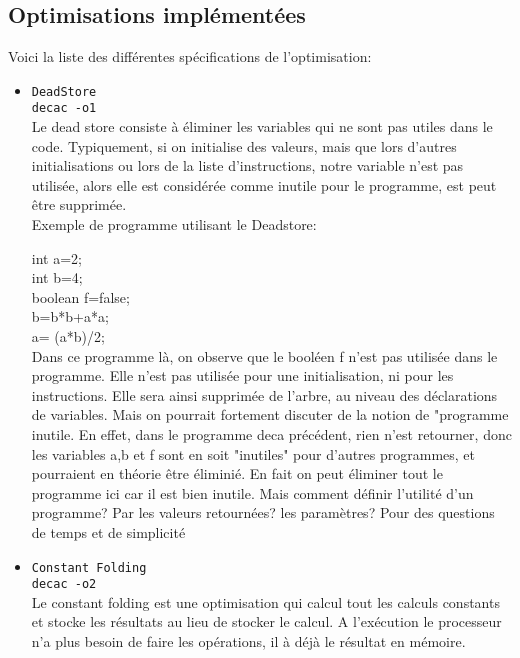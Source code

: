 \documentclass[a4paper]{article}
\begin{document}
\subsection{Optimisations implémentées}
Voici la liste des différentes spécifications de l'optimisation:
\begin{itemize}
\item \texttt{DeadStore} \\
      \texttt{decac -o1} \\
Le dead store consiste à éliminer les variables qui ne sont pas utiles dans le code. Typiquement, si on initialise des valeurs, mais que lors d'autres initialisations ou lors de la liste d'instructions, notre variable n'est pas utilisée, alors elle est considérée comme inutile pour le programme, est peut être supprimée. \\
Exemple de programme utilisant le Deadstore:
\begin{center}
int a=2;\\
int b=4;\\
boolean f=false;\\
b=b*b+a*a;\\
a= (a*b)/2;\\
Dans ce programme là, on observe que le booléen f n'est pas utilisée dans le programme. Elle n'est pas utilisée pour une initialisation, ni pour les instructions. Elle sera ainsi supprimée de l'arbre, au niveau des déclarations de variables. Mais on pourrait fortement discuter de la notion de "programme inutile. En effet, dans le programme deca précédent, rien n'est retourner, donc les variables a,b et f sont en soit "inutiles" pour d'autres programmes, et pourraient en théorie être éliminié. En fait on peut éliminer tout le programme ici car il est bien inutile. Mais comment définir l'utilité d'un programme? Par les valeurs retournées? les paramètres? Pour des questions de temps et de simplicité  
\end{center}
\item \texttt{Constant Folding}\\
\texttt{decac -o2}\\
Le constant folding est une optimisation qui calcul tout les calculs constants et stocke les résultats au lieu de stocker le calcul. A l'exécution le processeur n'a plus besoin de faire les opérations, il à déjà le résultat en mémoire.
     \end{itemize}
\end{document}
